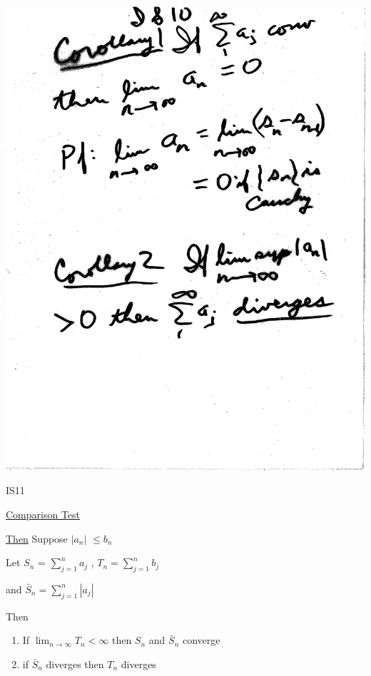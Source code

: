 \documentclass[10pt,a4paper]{article}
\begin{document}
\includegraphics[scale=.5]{Pages/IS_10}

\newpage

\begin{center}
IS11

\underline{Comparison Test}
\end{center}

\underline{Then}
Suppose $|a_n|$ $\le b_n$

Let $S_n$ = $\sum_{j=1}^{n} a_j$ , $T_n = \sum_{j=1}^{n} b_j$

and $\bar{S}_n = \sum_{j=1}^{n}| a_j |$

Then

\begin{enumerate}[i]

\item If  $\lim_{n\to\infty} T_n < \infty$ then $S_n$ and $\bar{S}_n$ converge

\item if $\bar{S}_n$ diverges then $T_n$ diverges
\end{enumerate}
\end{document}
